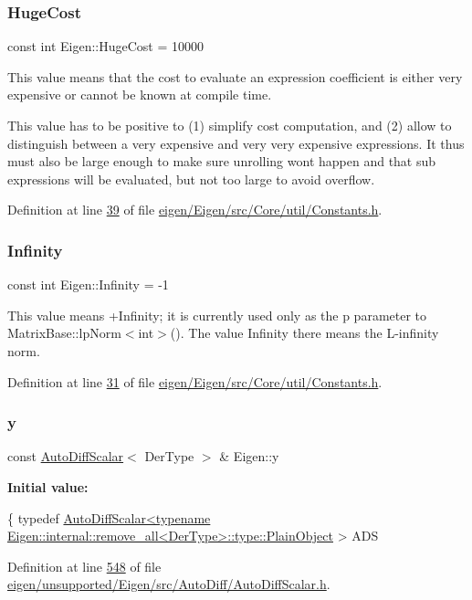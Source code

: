 \subsubsection{\texorpdfstring{Huge\+Cost}{HugeCost}}
{\footnotesize\ttfamily const int Eigen\+::\+Huge\+Cost = 10000}

This value means that the cost to evaluate an expression coefficient is either very expensive or cannot be known at compile time.

This value has to be positive to (1) simplify cost computation, and (2) allow to distinguish between a very expensive and very very expensive expressions. It thus must also be large enough to make sure unrolling won\textquotesingle{}t happen and that sub expressions will be evaluated, but not too large to avoid overflow. 

Definition at line \hyperlink{eigen_2_eigen_2src_2_core_2util_2_constants_8h_source_l00039}{39} of file \hyperlink{eigen_2_eigen_2src_2_core_2util_2_constants_8h_source}{eigen/\+Eigen/src/\+Core/util/\+Constants.\+h}.

\mbox{\label{namespace_eigen_a7951593b031e13d90223c83d022ce99e}} 
\subsubsection{\texorpdfstring{Infinity}{Infinity}}
{\footnotesize\ttfamily const int Eigen\+::\+Infinity = -\/1}

This value means +\+Infinity; it is currently used only as the p parameter to Matrix\+Base\+::lp\+Norm$<$int$>$(). The value Infinity there means the L-\/infinity norm. 

Definition at line \hyperlink{eigen_2_eigen_2src_2_core_2util_2_constants_8h_source_l00031}{31} of file \hyperlink{eigen_2_eigen_2src_2_core_2util_2_constants_8h_source}{eigen/\+Eigen/src/\+Core/util/\+Constants.\+h}.

\mbox{\label{namespace_eigen_ae998329a5bd49a32b6048a27e1a232a0}} 
\subsubsection{\texorpdfstring{y}{y}}
{\footnotesize\ttfamily const \hyperlink{class_eigen_1_1_auto_diff_scalar}{Auto\+Diff\+Scalar}$<$ Der\+Type $>$ \& Eigen\+::y}

{\bfseries Initial value\+:}
\begin{DoxyCode}
\{
  \textcolor{keyword}{typedef} 
      \hyperlink{class_eigen_1_1_auto_diff_scalar}{AutoDiffScalar<typename Eigen::internal::remove\_all<DerType>::type::PlainObject}
      > ADS
\end{DoxyCode}


Definition at line \hyperlink{eigen_2unsupported_2_eigen_2src_2_auto_diff_2_auto_diff_scalar_8h_source_l00548}{548} of file \hyperlink{eigen_2unsupported_2_eigen_2src_2_auto_diff_2_auto_diff_scalar_8h_source}{eigen/unsupported/\+Eigen/src/\+Auto\+Diff/\+Auto\+Diff\+Scalar.\+h}.

